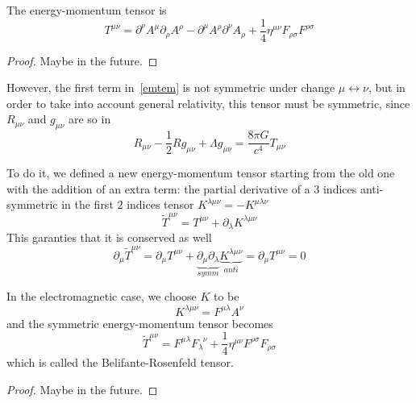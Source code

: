     The energy-momentum tensor is 
    \begin{equation}\label{emtem}
        T^{\mu\nu} = \partial^\nu A^\mu \partial_\rho A^\rho - \partial^\mu A^\rho \partial^\nu A_\rho + \frac{1}{4} \eta^{\mu\nu} F_{\rho \sigma} F^{\rho\sigma}
    \end{equation}

    \begin{proof}
        Maybe in the future.
    \end{proof}

    However, the first term in~\eqref{emtem} is not symmetric under change $\mu \leftrightarrow \nu$, but in order to take into account general relativity, this tensor must be symmetric, since $R_{\mu\nu}$ and $g_{\mu\nu}$ are so in
    \begin{equation*}
        R_{\mu\nu} - \frac{1}{2} R g_{\mu\nu} + \Lambda g_{\mu\nu} = \frac{8 \pi G}{c^4} T_{\mu\nu}
    \end{equation*}

    To do it, we defined a new energy-momentum tensor starting from the old one with the addition of an extra term: the partial derivative of a $3$ indices anti-symmetric in the first $2$ indices tensor $K^{\lambda\mu\nu} = - K^{\mu\lambda\nu}$
    \begin{equation*}
        \tilde T^{\mu\nu} = T^{\mu\nu} + \partial_\lambda K^{\lambda\mu\nu}
    \end{equation*} 
    This garanties that it is conserved as well 
    \begin{equation*}
        \partial_\mu \tilde T^{\mu\nu} = \partial_\mu T^{\mu\nu} + \underbrace{\partial_\mu \partial_\lambda}_{symm} \underbrace{K^{\lambda\mu\nu}}_{anti} = \partial_\mu T^{\mu\nu} = 0
    \end{equation*}

    In the electromagnetic case, we choose $K$ to be 
    \begin{equation*}
        K^{\lambda\mu\nu} = F^{\mu\lambda} A^\nu
    \end{equation*}
    and the symmetric energy-momentum tensor becomes 
    \begin{equation*}
        \tilde T^{\mu\nu} = F^{\mu\lambda} F_{\lambda}^{\phantom \lambda \nu} + \frac{1}{4} \eta^{\mu\nu} F^{\rho\sigma} F_{\rho\sigma}
    \end{equation*}
    which is called the Belifante-Rosenfeld tensor.

    \begin{proof}
        Maybe in the future.
    \end{proof}

